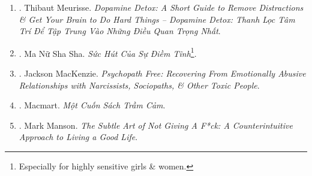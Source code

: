 \documentclass{article}
\begin{document}
\begin{enumerate}
	{\sf Editorial Reviews.}
	\begin{itemize}
		\item ``Better than most YouTube videos on topic'' -- {\sc Jeremy Tarbush}
		\item ``1 of best books I've read'' -- {\sc Kaylee}
		\item ``1 of most straightforward self help books I've read. Short \& laser-focused'' -- Amazon customer
		\item ``Literally life-changing!'' -- Amazon customer
		\item ``This book is so concise \& practical \& most importantly -- a VERY quick read. I maybe spent $< 1$ hour reading it \& I have already gained so much from it.'' -- Amazon customer
	\end{itemize}
	\begin{itemize}
		\item ``Build the foundations for success 1 brick at a time. Build them strong so that they won't collapse at the 1st obstacle or setback.''
		\item ``Dopamine gives us the desire to take action to earn the exciting reward that's waiting for us. It is the force that makes us act.''
		\item ``By receiving constant feedback, whether through likes, comments, or immediate replies to our messages, we condition ourselves to expect fast results with everything we do.''
	\end{itemize}

	\item \cite{Meurisse_dopamine_VN}. {\sc Thibaut Meurisse}. {\it Dopamine Detox: A Short Guide to Remove Distractions \& Get Your Brain to Do Hard Things -- Dopamine Detox: Thanh Lọc Tâm Trí Để Tập Trung Vào Những Điều Quan Trọng Nhất}.\hfill{\sf[done]}

	\item \cite{MNSS_calm}. Ma Nữ Sha Sha. {\it Sức Hút Của Sự Điềm Tĩnh}\footnote{Especially for highly sensitive girls \& women.}.\hfill{\sf[done]}

	\item \cite{MacKenzie2015}. Jackson MacKenzie. {\it Psychopath Free: Recovering From Emotionally Abusive Relationships with Narcissists, Sociopaths, \& Other Toxic People}.\hfill{\sf[done]}
	\item \cite{Macmart_depress}. Macmart. {\it Một Cuốn Sách Trầm Cảm}.\hfill{\sf[done]}

	\item \cite{Manson_giving_fuck}. Mark Manson. {\it The Subtle Art of Not Giving A F*ck: A Counterintuitive Approach to Living a Good Life}.\hfill{\sf[reading]}


\end{enumerate}
\end{document}
